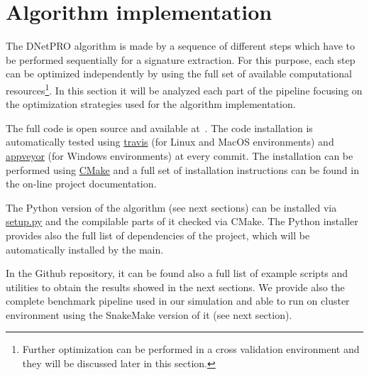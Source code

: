 \documentclass{standalone}
\begin{document}
\section[DNetPRO Implementation]{Algorithm implementation}\label{implementation:implementation}

The DNetPRO algorithm is made by a sequence of different steps which have to be performed sequentially for a signature extraction.
For this purpose, each step can be optimized independently by using the full set of available computational resources\footnote{
Further optimization can be performed in a cross validation environment and they will be discussed later in this section.
}.
In this section it will be analyzed each part of the pipeline focusing on the optimization strategies used for the algorithm implementation.

The full code is open source and available at~\cite{DNetPRO}.
The code installation is automatically tested using \href{https://github.com/Nico-Curti/DNetPRO/blob/master/.travis.yml
}{\textsf{travis}} (for Linux and MacOS environments) and \href{https://github.com/Nico-Curti/DNetPRO/blob/master/appveyor.yml}{\textsf{appveyor}} (for Windows environments) at every commit.
The installation can be performed using \href{https://github.com/Nico-Curti/DNetPRO/blob/master/CMakeLists.txt}{\textsf{CMake}} and a full set of installation instructions can be found in the on-line project documentation.

The \textsf{Python} version of the algorithm (see next sections) can be installed via \href{https://github.com/Nico-Curti/DNetPRO/blob/master/setup.py}{\textsf{setup.py}} and the compilable parts of it checked via \textsf{CMake}.
The \textsf{Python} installer provides also the full list of dependencies of the project, which will be automatically installed by the main.

In the Github repository, it can be found also a full list of example scripts and utilities to obtain the results showed in the next sections.
We provide also the complete benchmark pipeline used in our simulation and able to run on cluster environment using the \textsf{SnakeMake} version of it (see next section).
\end{document}
